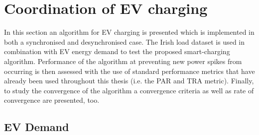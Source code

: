 \section{Coordination of EV charging}
\label{ch3:sec:ev-coordination}

In this section an algorithm for EV charging is presented which is implemented in both a synchronised and desynchronised case.
The Irish load dataset \cite{IrishData2002} is used in combination with EV energy demand to test the proposed smart-charging algorithm.
Performance of the algorithm at preventing new power spikes from occurring is then assessed with the use of standard performance metrics that have already been used throughout this thesis (i.e. the PAR and TRA metric).
Finally, to study the convergence of the algorithm a convergence criteria as well as rate of convergence are presented, too.

\subsection{EV Demand}



